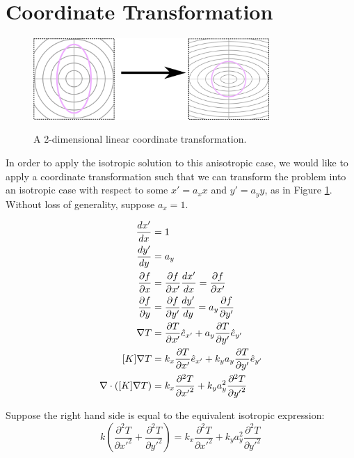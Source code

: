 \section{Coordinate Transformation}
\label{sec:analytical-np:transformation}

\begin{figure}[h]
\centering
\includegraphics[width=0.8\textwidth]{fig/coordinate_transformation.png}
\label{fig:coord_trans}
\caption{A 2-dimensional linear coordinate transformation.}
\end{figure}

In order to apply the isotropic solution to this anisotropic case, we would like
to apply a coordinate transformation such that we can transform the problem into
an isotropic case with respect to some \(x' = a_x x\) and \(y' = a_y y\), as in
Figure \ref{fig:coord_trans}.
Without loss of generality, suppose \(a_x = 1\).

\begin{align}
\frac{dx'}{dx} &= 1\\
\frac{dy'}{dy} &= a_y\\
\frac{\partial f}{\partial x} &= \frac{\partial f}{\partial x'}\frac{dx'}{dx} = \frac{\partial f}{\partial x'}\\
\frac{\partial f}{\partial y} &= \frac{\partial f}{\partial y'}\frac{dy'}{dy} = a_y\frac{\partial f}{\partial y'}\\
\nabla T &= \frac{\partial T}{\partial x'} \hat{e}_{x'} + a_y\frac{\partial T}{\partial y'} \hat{e}_{y'} \\
[K]\nabla T &= k_x\frac{\partial T}{\partial x'} \hat{e}_{x'} + k_ya_y\frac{\partial T}{\partial y'} \hat{e}_{y'}\\
\nabla \cdot \left([K]\nabla T\right) &= k_x\frac{\partial^2 T}{\partial {x'}^2} + k_ya_y^2\frac{\partial^2 T}{\partial {y'}^2}\\
\end{align}

Suppose the right hand side is equal to the equivalent isotropic expression:
\begin{equation*}
k\left(\frac{\partial^2 T}{\partial {x'}^2} + \frac{\partial^2 T}{\partial {y'}^2} \right) = k_x\frac{\partial^2 T}{\partial {x'}^2} + k_ya_y^2\frac{\partial^2 T}{\partial {y'}^2}
\end{equation*}


